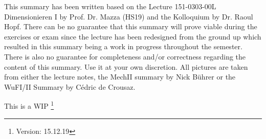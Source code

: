 



\maketitle
\begin{center}
    This summary has been written based on the Lecture 151-0303-00L  Dimensionieren I by Prof. Dr. Mazza (HS19) and the Kolloquium by Dr. Raoul Hopf. There can be no guarantee that this summary will prove viable during the exercises or exam since the lecture has been redesigned from the ground up which resulted in this summary being a work in progress throughout the semester. There is also no guarantee for completeness and/or correctness regarding the content of this summary. Use it at your own discretion. All pictures are taken from either the lecture notes, the MechII summary by Nick Bührer or the WuFI/II Summary by Cédric de Crousaz.
    
    This is a WIP 
    \footnote{\label{foot:2}Version: 15.12.19}
\end{center}
\newpage
\begin{multicols*}{3}




















\end{multicols*}     

